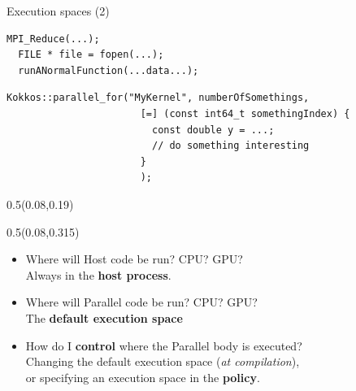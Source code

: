 \ifmedium
\begin{frame}[fragile]{Execution spaces (2)}


  \begin{lstlisting}[linebackgroundcolor={
        \btLstHL{1-3}{darkred!20}
      }
    ]
  MPI_Reduce(...);
  FILE * file = fopen(...);
  runANormalFunction(...data...);
  \end{lstlisting}

  \vspace{-11pt}

  \begin{lstlisting}[linebackgroundcolor={
        \btLstHL{3-4}{bodyColor}
      }
    ]
  Kokkos::parallel_for("MyKernel", numberOfSomethings,
                       [=] (const int64_t somethingIndex) {
                         const double y = ...;
                         // do something interesting
                       }
                       );
  \end{lstlisting}

  \vspace{-5pt}

  \begin{textblock*}{0.5\textwidth}(0.08\textwidth,0.19\textheight)
  \end{textblock*}

  \begin{textblock*}{0.5\textwidth}(0.08\textwidth,0.315\textheight)
  \end{textblock*}

  \pause

  \begin{itemize}
    \item<2->{Where will {\color{darkred!80}Host} code be run?  CPU?  GPU? \\
        \hspace{20pt}{$\Rightarrow$} Always in the \textbf{host process}.}
    \item<3->{Where will {\color{blue!80}Parallel} code be run?  CPU?  GPU? \\
      \hspace{20pt}{$\Rightarrow$} The \textbf{default execution space}}
    \item<4->{How do I \textbf{control} where the {\color{blue!80}Parallel} body is executed? \\
      \hspace{20pt}Changing the default execution space (\textit{at compilation}), \\
      \hspace{20pt}or specifying an execution space in the \textbf{policy}.}
  \end{itemize}

\end{frame}
\fi

